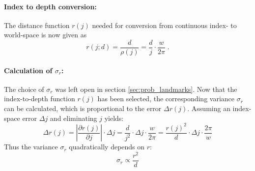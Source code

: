 \paragraph{Index to depth conversion:} The distance function $r(j)$ needed for conversion from continuous index- to world-space is now given as
\begin{equation}
  r(j; d) = \frac{d}{\rho(j)} = \frac{d}j \cdot \frac{w}{2 \pi} \; .
\end{equation}


\paragraph{Calculation of $\sigma_r$:} The choice of $\sigma_r$ was left open in section \ref{sec:prob_landmarks}. Now that the index-to-depth function $r(j)$ has been selected, the corresponding variance $\sigma_r$ can be calculated, which is proportional to the error $\Delta r(j)$. Assuming an index-space error $\Delta j$ and eliminating $j$ yields:
\begin{equation}
  \Delta r(j) = \left| \frac{\partial r(j)}{\partial j} \right| \cdot \Delta j = \frac{d}{j^2} \cdot \Delta j \cdot \frac{w}{2 \pi} = \frac{r(j)^2}{d} \cdot \Delta j \cdot \frac{2 \pi}{w}
\end{equation}
Thus the variance $\sigma_r$ quadratically depends on $r$:
\begin{equation}
\sigma_r \propto \frac{r^2}{d} \label{eqn:sigma_r}
\end{equation}
